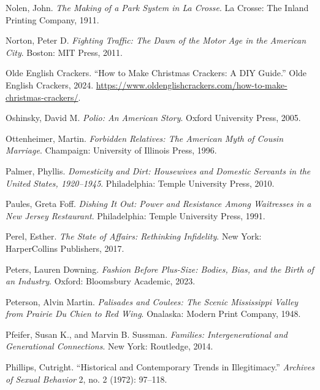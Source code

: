 \documentclass[
  letterpaper,
]{book}
\newlength{\cslhangindent}
\newenvironment{CSLReferences}[2] %
 {\begin{list}{}{%
  \setlength{\itemindent}{0pt}
  \setlength{\leftmargin}{0pt}
  \setlength{\parsep}{0pt}
  \ifodd #1
   \setlength{\leftmargin}{\cslhangindent}
   \setlength{\itemindent}{-1\cslhangindent}
  \fi
  \setlength{\itemsep}{#2\baselineskip}}}
 {\end{list}}
\begin{document}
\begin{CSLReferences}{1}{0}
Nolen, John. \emph{The Making of a Park System in La Crosse}. La Crosse:
The Inland Printing Company, 1911.

Norton, Peter D. \emph{Fighting Traffic: The Dawn of the Motor Age in
the American City}. Boston: MIT Press, 2011.

Olde English Crackers. {``How to Make Christmas Crackers: A DIY
Guide.''} Olde English Crackers, 2024.
\url{https://www.oldenglishcrackers.com/how-to-make-christmas-crackers/}.

Oshinsky, David M. \emph{Polio: An American Story}. Oxford University
Press, 2005.

Ottenheimer, Martin. \emph{Forbidden Relatives: The American Myth of
Cousin Marriage}. Champaign: University of Illinois Press, 1996.

Palmer, Phyllis. \emph{Domesticity and Dirt: Housewives and Domestic
Servants in the United States, 1920--1945}. Philadelphia: Temple
University Press, 2010.

Paules, Greta Foff. \emph{Dishing It Out: Power and Resistance Among
Waitresses in a New Jersey Restaurant}. Philadelphia: Temple University
Press, 1991.

Perel, Esther. \emph{The State of Affairs: Rethinking Infidelity}. New
York: HarperCollins Publishers, 2017.

Peters, Lauren Downing. \emph{Fashion Before Plus-Size: Bodies, Bias,
and the Birth of an Industry}. Oxford: Bloomsbury Academic, 2023.

Peterson, Alvin Martin. \emph{Palisades and Coulees: The Scenic
Mississippi Valley from Prairie Du Chien to Red Wing}. Onalaska: Modern
Print Company, 1948.

Pfeifer, Susan K., and Marvin B. Sussman. \emph{Families:
Intergenerational and Generational Connections}. New York: Routledge,
2014.

Phillips, Cutright. {``Historical and Contemporary Trends in
Illegitimacy.''} \emph{Archives of Sexual Behavior} 2, no. 2 (1972):
97--118.


\end{CSLReferences}
\end{document}
